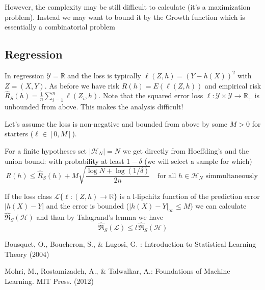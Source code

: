 However, the complexity may be still difficult to calculate (it's a maximization problem).
Instead we may want to bound it by the Growth function which is essentially a combinatorial problem 

\subsection{Regression}

In regression $\mathcal{Y} = \mathbb{R}$ and the loss is typically $\ell(Z,h) = (Y - h(X))^2$ with $Z = (X,Y)$.
As before we have risk $R(h) = E(\ell(Z,h))$ and empirical risk $\widehat{R}_S(h) = \frac{1}{n} \sum_{i=1}^n  \ell(Z_i,h) $.
Note that the squared error loss $\ell : \mathcal{Y} \times \mathcal{Y} \to \mathbb{R}_+$ is unbounded from above. This makes the analysis difficult!

Let's assume the loss is non-negative and bounded from above by some $M>0$ for starters ($\ell \in [0,M]$).

For a finite hypotheses set $|\mathcal{H}_N| = N$ we get directly from Hoeffding's and the union bound: with probability at least $1-\delta$ (we will select a sample for which)
\begin{equation}
R(h)  \leq \widehat{R}_S(h) + M \sqrt{\frac{\log N + \log (1/ \delta)}{2n}} \quad \text{for all } h \in \mathcal{H}_N \text{ simmultaneously }
\end{equation}

If the loss class $\mathcal{L} \{\ell:(Z,h) \to \mathbb{R} \}$ is a l-lipchitz function of the prediction error $|h(X) - Y|$ and the error is bounded ($|h(X) - Y|_\infty \leq M$) we can calculate $\widehat{\mathfrak{R}}_S(\mathcal{H})$ and than by Talagrand's lemma we have 
\begin{equation}
\widehat{\mathfrak{R}}_S(\mathcal{\mathcal{L}}) \leq l \,\widehat{\mathfrak{R}}_S(\mathcal{H})
\end{equation}










\begin{thebibliography}{9}

Bousquet, O., Boucheron, S., \& Lugosi, G. : Introduction to Statistical Learning Theory (2004)

Mohri, M., Rostamizadeh, A., \& Talwalkar, A.: Foundations of Machine Learning. MIT Press. (2012)

\end{thebibliography}
